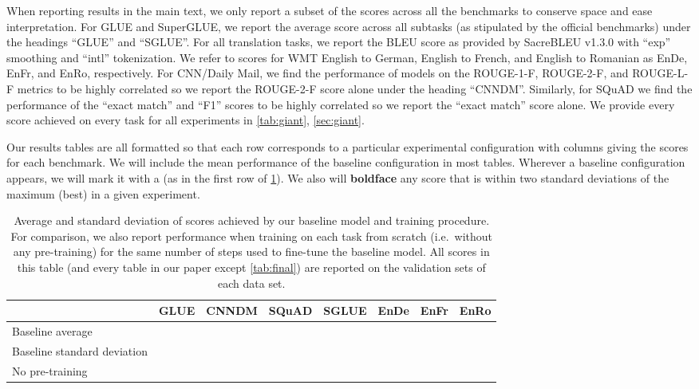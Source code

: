 \documentclass[twoside,11pt]{article}
\newcommand{\bsl}{\makebox[0pt][r]{\raisebox{0.05em}{}}}
\begin{document}
When reporting results in the main text, we only report a subset of the scores across all the benchmarks to conserve space and ease interpretation.
For GLUE and SuperGLUE, we report the average score across all subtasks (as stipulated by the official benchmarks) under the headings ``GLUE'' and ``SGLUE''.
For all translation tasks, we report the BLEU score \citep{papineni2002bleu} as provided by SacreBLEU v1.3.0 \citep{post2018call} with ``exp'' smoothing and ``intl'' tokenization.
We refer to scores for WMT English to German, English to French, and English to Romanian as EnDe, EnFr, and EnRo, respectively.
For CNN/Daily Mail, we find the performance of models on the ROUGE-1-F, ROUGE-2-F, and ROUGE-L-F metrics \citep{lin2004rouge} to be highly correlated so we report the ROUGE-2-F score alone under the heading ``CNNDM''.
Similarly, for SQuAD we find the performance of the ``exact match'' and ``F1'' scores to be highly correlated so we report the ``exact match'' score alone.
We provide every score achieved on every task for all experiments in \cref{tab:giant}, \cref{sec:giant}.

Our results tables are all formatted so that each row corresponds to a particular experimental configuration with columns giving the scores for each benchmark.
We will include the mean performance of the baseline configuration in most tables.
Wherever a baseline configuration appears, we will mark it with a  (as in the first row of \cref{tab:baseline}).
We also will \textbf{boldface} any score that is within two standard deviations of the maximum (best) in a given experiment.

\begin{table}
\footnotesize
\centering
\begin{tabular}{l c c c c c c c}
\toprule
                                & GLUE        & CNNDM       & SQuAD       & SGLUE       & EnDe        & EnFr        & EnRo    \\
\midrule
    \bsl Baseline average       &  &  &  &  &  &  &  \\
    Baseline standard deviation &      &      &      &      &      &      &  \\
    No pre-training             &      &      &      &      &      &  &  \\
\bottomrule
\end{tabular}
\caption{
Average and standard deviation of scores achieved by our baseline model and training procedure.
For comparison, we also report performance when training on each task from scratch (i.e.\ without any pre-training) for the same number of steps used to fine-tune the baseline model.
All scores in this table (and every table in our paper except \cref{tab:final}) are reported on the validation sets of each data set.
}
\label{tab:baseline}
\end{table}
\end{document}
